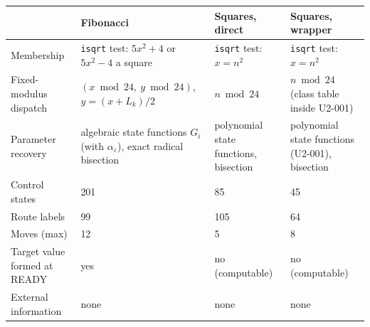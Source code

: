 \begin{tabular}{@{}p{3.1cm}p{3.6cm}p{3.6cm}p{3.6cm}@{}}\toprule & Fibonacci & Squares, direct & Squares, wrapper\\\midrule
Membership & \texttt{isqrt} test: $5x^2+4$ or $5x^2-4$ a square & \texttt{isqrt} test: $x=n^2$ & \texttt{isqrt} test: $x=n^2$\\
Fixed-modulus dispatch & $(x \bmod 24,\ y \bmod 24)$, $y=(x+L_k)/2$ & $n \bmod 24$ & $n \bmod 24$ (class table inside U2-001)\\
Parameter recovery & algebraic state functions $G_i$ (with $\alpha_\varepsilon$), exact radical bisection & polynomial state functions, bisection & polynomial state functions (U2-001), bisection\\
Control states & 201 & 85 & 45\\
Route labels & 99 & 105 & 64\\
Moves (max) & 12 & 5 & 8\\
Target value formed at READY & yes & no (computable) & no (computable)\\
External information & none & none & none\\
\bottomrule\end{tabular}
